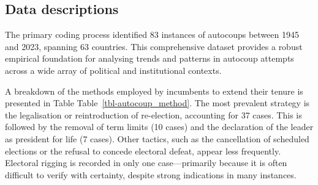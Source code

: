 \documentclass[
  12pt,
]{report}
\begin{document}
\subsection*{Data descriptions}\label{data-descriptions}

The primary coding process identified 83 instances of autocoups between
1945 and 2023, spanning 63 countries. This comprehensive dataset
provides a robust empirical foundation for analysing trends and patterns
in autocoup attempts across a wide array of political and institutional
contexts.

A breakdown of the methods employed by incumbents to extend their tenure
is presented in Table Table~\ref{tbl-autocoup_method}. The most
prevalent strategy is the legalisation or reintroduction of re-election,
accounting for 37 cases. This is followed by the removal of term limits
(10 cases) and the declaration of the leader as president for life (7
cases). Other tactics, such as the cancellation of scheduled elections
or the refusal to concede electoral defeat, appear less frequently.
Electoral rigging is recorded in only one case---primarily because it is
often difficult to verify with certainty, despite strong indications in
many instances.

\begin{table}

\caption{\label{tbl-autocoup_method}Autocoup methods and success rates
(1945-2023)}


\end{table}%
\end{document}
